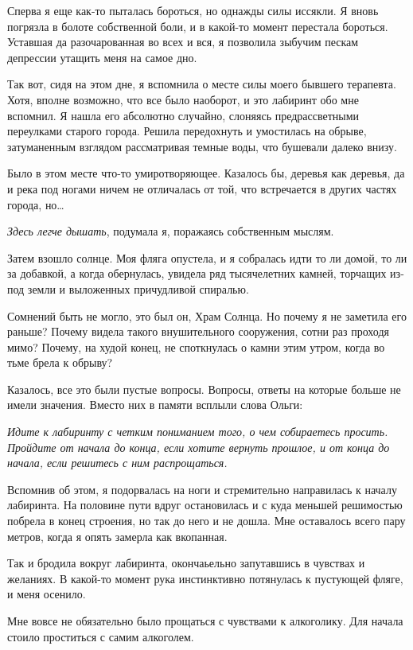 \documentclass[
]{book}
\begin{document}
Сперва я еще как-то пыталась бороться, но однажды силы иссякли. Я вновь погрязла в болоте собственной боли, и в какой-то момент перестала бороться. Уставшая да разочарованная во всех и вся, я позволила зыбучим пескам депрессии утащить меня на самое дно.

Так вот, сидя на этом дне, я вспомнила о месте силы моего бывшего терапевта. Хотя, вполне возможно, что все было наоборот, и это лабиринт обо мне вспомнил. Я нашла его абсолютно случайно, слоняясь предрассветными переулками старого города. Решила передохнуть и умостилась на обрыве, затуманенным взглядом рассматривая темные воды, что бушевали далеко внизу.

Было в этом месте что-то умиротворяющее. Казалось бы, деревья как деревья, да и река под ногами ничем не отличалась от той, что встречается в других частях города, но\ldots{}

\emph{Здесь легче дышать}, подумала я, поражаясь собственным мыслям.

Затем взошло солнце. Моя фляга опустела, и я собралась идти то ли домой, то ли за добавкой, а когда обернулась, увидела ряд тысячелетних камней, торчащих из-под земли и выложенных причудливой спиралью.

Сомнений быть не могло, это был он, Храм Солнца. Но почему я не заметила его раньше? Почему видела такого внушительного сооружения, сотни раз проходя мимо? Почему, на худой конец, не споткнулась о камни этим утром, когда во тьме брела к обрыву?

Казалось, все это были пустые вопросы. Вопросы, ответы на которые больше не имели значения. Вместо них в памяти всплыли слова Ольги:

\emph{Идите к лабиринту с четким пониманием того, о чем собираетесь просить. Пройдите от начала до конца, если хотите вернуть прошлое, и от конца до начала, если решитесь с ним распрощаться.}

Вспомнив об этом, я подорвалась на ноги и стремительно направилась к началу лабиринта. На половине пути вдруг остановилась и с куда меньшей решимостью побрела в конец строения, но так до него и не дошла. Мне оставалось всего пару метров, когда я опять замерла как вкопанная.

Так и бродила вокруг лабиринта, окончаьельно запутавшись в чувствах и желаниях. В какой-то момент рука инстинктивно потянулась к пустующей фляге, и меня осенило.

Мне вовсе не обязательно было прощаться с чувствами к алкоголику. Для начала стоило проститься с самим алкоголем.
\end{document}
